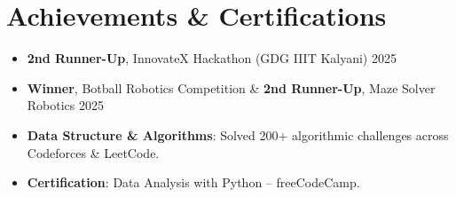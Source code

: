 \documentclass[10pt,letterpaper]{article}
\begin{document}
\section{Achievements \& Certifications}
\begin{itemize}
    \item \textbf{2nd Runner-Up}, InnovateX Hackathon (GDG IIIT Kalyani) \hfill 2025
    \item \textbf{Winner}, Botball Robotics Competition \& \textbf{2nd Runner-Up}, Maze Solver Robotics \hfill 2025
    \item \textbf{Data Structure \& Algorithms}: Solved 200+ algorithmic challenges across Codeforces & LeetCode.
    \item \textbf{Certification}: Data Analysis with Python -- freeCodeCamp.
\end{itemize}
\end{document}
